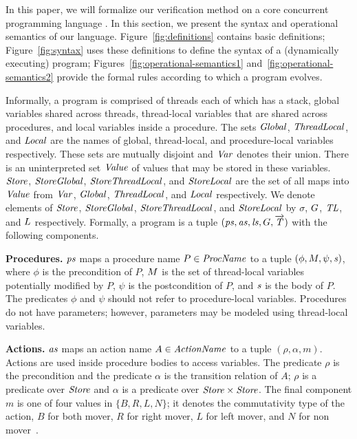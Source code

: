 In this paper, we will formalize our verification method on a core concurrent programming language \civl.
In this section, we present the syntax and operational semantics of our language.
Figure~\ref{fig:definitions} contains basic definitions; 
Figure~\ref{fig:syntax} uses these definitions to define the syntax of a (dynamically executing) \civl program;
Figures~\ref{fig:operational-semantics1} and~\ref{fig:operational-semantics2} provide the formal rules according 
to which a \civl program evolves.

Informally, a \civl program is comprised of threads each of which has a stack, global variables shared across threads, 
thread-local variables that are shared across procedures, and local variables inside a procedure.
The sets $\mathit{Global}$, $\mathit{ThreadLocal}$, and $\mathit{Local}$ are the names of global, thread-local, and procedure-local variables 
respectively.
These sets are mutually disjoint and $\mathit{Var}$ denotes their union.
There is an uninterpreted set $\mathit{Value}$ of values that may be stored in these variables.
$\mathit{Store}$, $\mathit{StoreGlobal}$, $\mathit{StoreThreadLocal}$, and $\mathit{StoreLocal}$ are the set of all maps into $\mathit{Value}$
from $\mathit{Var}$, $\mathit{Global}$, $\mathit{ThreadLocal}$, and $\mathit{Local}$ respectively.
We denote elements of $\mathit{Store}$, $\mathit{StoreGlobal}$, $\mathit{StoreThreadLocal}$, and $\mathit{StoreLocal}$
by $\sigma$, $G$, $\mathit{TL}$, and $L$ respectively.
Formally, a \civl program is a tuple $(\mathit{ps}, \mathit{as}, \mathit{ls}, G, \overrightarrow{\mathit{T}})$ with the following components.

\noindent
{\bf Procedures.}
$\mathit{ps}$ maps a procedure name $P \in \mathit{ProcName}$ to a tuple $(\phi, M, \psi, \mathit{s})$, 
where $\phi$ is the precondition of $P$, $M$ is the set of thread-local variables potentially modified by $P$, 
$\psi$ is the postcondition of $P$, and $\mathit{s}$ is the body of $P$.
The predicates $\phi$ and $\psi$ should not refer to procedure-local variables.
Procedures do not have parameters; however, parameters may be modeled using thread-local variables.

\noindent
{\bf Actions.}
$\mathit{as}$ maps an action name $A \in \mathit{ActionName}$ to a tuple $(\rho,\alpha,m)$.
Actions are used inside procedure bodies to access variables.
The predicate $\rho$ is the precondition and the predicate $\alpha$ is the transition relation of $A$;
$\rho$ is a predicate over $\mathit{Store}$ and $\alpha$ is a predicate over $\mathit{Store} \times \mathit{Store}$.
The final component $m$ is one of four values in $\{B,R,L,N\}$;
it denotes the commutativity type of the action, $B$ for both mover, $R$ for right mover, $L$ for left mover, 
and $N$ for non mover~\cite{FlanaganFLQ08}. 

